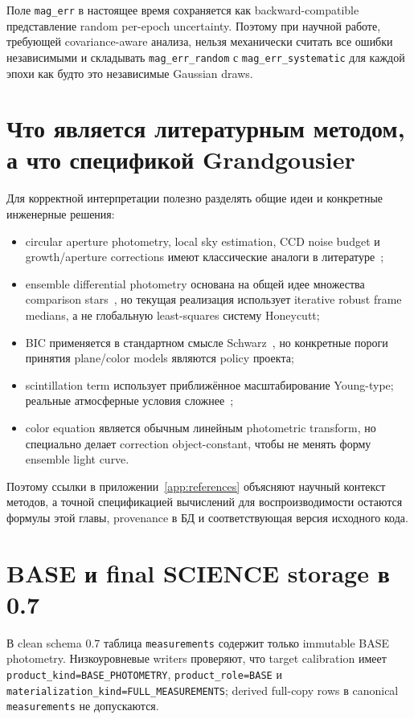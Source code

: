 Поле \texttt{mag\_err} в настоящее время сохраняется как backward-compatible представление random per-epoch uncertainty. Поэтому при научной работе, требующей covariance-aware анализа, нельзя механически считать все ошибки независимыми и складывать \texttt{mag\_err\_random} с \texttt{mag\_err\_systematic} для каждой эпохи как будто это независимые Gaussian draws.

\section{Что является литературным методом, а что спецификой Grandgousier}

Для корректной интерпретации полезно разделять общие идеи и конкретные инженерные решения:

\begin{itemize}
  \item circular aperture photometry, local sky estimation, CCD noise budget и growth/aperture corrections имеют классические аналоги в литературе~\cite{howell1989,stetson1987};
  \item ensemble differential photometry основана на общей идее множества comparison stars~\cite{honeycutt1992}, но текущая реализация \program{} использует iterative robust frame medians, а не глобальную least-squares систему Honeycutt;
  \item BIC применяется в стандартном смысле Schwarz~\cite{schwarz1978}, но конкретные пороги принятия plane/color models являются policy проекта;
  \item scintillation term использует приближённое масштабирование Young-type; реальные атмосферные условия сложнее~\cite{dravins1998};
  \item color equation является обычным линейным photometric transform, но \program{} специально делает correction object-constant, чтобы не менять форму ensemble light curve.
\end{itemize}

Поэтому ссылки в приложении~\ref{app:references} объясняют научный контекст методов, а точной спецификацией вычислений для воспроизводимости остаются формулы этой главы, provenance в БД и соответствующая версия исходного кода.

\section{BASE и final SCIENCE storage в 0.7}

В clean schema 0.7 таблица \texttt{measurements} содержит только immutable BASE
photometry. Низкоуровневые writers проверяют, что target calibration имеет
\texttt{product\_kind=BASE\_PHOTOMETRY}, \texttt{product\_role=BASE} и
\texttt{materialization\_kind=FULL\_MEASUREMENTS}; derived full-copy rows в
canonical \texttt{measurements} не допускаются.

